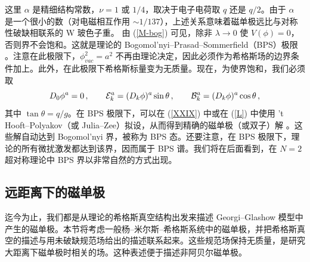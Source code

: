 这里 $\alpha$ 是精细结构常数，$\nu=1$ 或 $1/4$，取决于电子电荷取 $q$ 还是 $q/2$。由于 $\alpha$ 是一个很小的数（对电磁相互作用 $\sim 1/137$），上述关系意味着磁单极远比与对称性破缺相联系的 W 玻色子重。
由 (\ref{M-bog}) 可见，除非 $\lambda\rightarrow 0$ 使 $V(\phi)=0$，否则界不会饱和。这就是理论的 Bogomol'nyi–Prasad–Sommerfield（BPS）极限 \cite{bogomol,PS}。注意在此极限下，$\phi_{vac}^2 =a^2$ 不再由理论决定，因此必须作为希格斯场的边界条件加上。此外，在此极限下希格斯标量变为无质量。现在，为使界饱和，我们必须取
\begin{equation}
D_0 \phi^a=0\,,\qquad {\cal E}^a_k=(D_k\phi)^a\sin\theta\,,
\qquad{\cal B}^a_k = (D_k\phi)^a\cos\theta\,,
\label{L}
\end{equation}
其中 $\tan\theta=q/g$。在 BPS 极限下，可以在 (\ref{XXIX}) 中或在 (\ref{L}) 中使用 't Hooft–Polyakov（或 Julia–Zee）拟设，从而得到精确的磁单极（或双子）解 \cite{bogomol, PS}。这些解自动达到 Bogomol'nyi 界，被称为 BPS 态。还要注意，在 BPS 极限下，理论的所有微扰激发都达到该界，因而属于 BPS 谱。我们将在后面看到，在 $N=2$ 超对称理论中 BPS 界以非常自然的方式出现。

\subsection{远距离下的磁单极}

迄今为止，我们都是从理论的希格斯真空结构出发来描述 Georgi–Glashow 模型中产生的磁单极。本节将考虑一般杨–米尔斯–希格斯系统中的磁单极，并把希格斯真空的描述与用未破缺规范场给出的描述联系起来。这些规范场保持无质量，是研究大距离下磁单极时相关的场。这种表述便于描述非阿贝尔磁单极。

